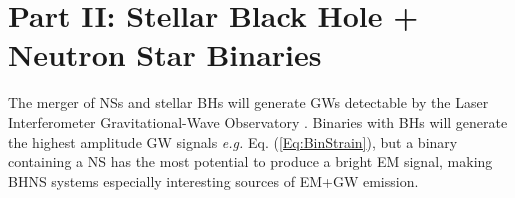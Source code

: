 	











































\section{Part II: Stellar Black Hole + Neutron Star Binaries}

The merger of NSs and stellar BHs will generate GWs detectable by the Laser
Interferometer Gravitational-Wave Observatory \citep[LIGO][]{aLIGO:2015}.
Binaries with BHs will generate the highest amplitude GW signals \emph{e.g.}
Eq. (\ref{Eq:BinStrain}), but a binary containing a NS has the most potential to
produce a bright EM signal, making BHNS systems especially interesting sources
of EM+GW emission.



